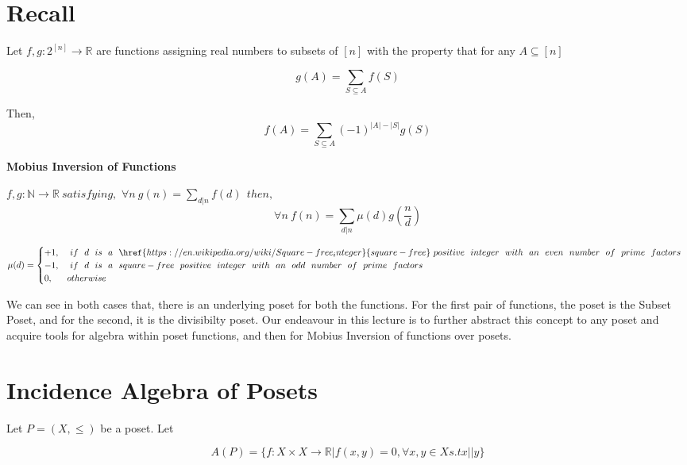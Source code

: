 
\section{Recall}

\begin{theorem}
  \label{stronger PIE}
  Let $f,g:2^{[n]}\longrightarrow \mathbb{R}$ are functions assigning real numbers to subsets of $[n]$ with the property that for any $A\subseteq [n]$

  \[ g(A)=\sum_{S\subseteq A} f(S)\]

  Then,
  \[ f(A) = \sum_{S \subseteq A} (-1)^{|A|-|S|}g(S)\]

\end{theorem}

\textbf{Mobius Inversion of Functions}

$f,g:\mathbb{N} \to \mathbb{R} ~satisfying,$ $\forall n ~g(n) = \sum_{d|n} f(d)  ~~then,$  
$$\forall n ~f(n) = \sum_{d|n} \mu(d)g(\frac{n}{d})$$

	\[
	\mu(d) = \begin{cases} 
	+1 , & ~if~ ~d~ ~is~ ~a~ ~\href{https://en.wikipedia.org/wiki/Square-free_integer}{square-free} ~positive~ ~integer~ ~with~ ~an~ ~even~ ~number~ ~of~ ~prime~ ~factors~~\\
 	-1 , & ~if~ ~d~ ~is~ ~a~ ~square-free~ ~positive~ ~integer~ ~with~ ~an~ ~odd~ ~number~ ~of~ ~prime~ ~factors~~\\
	0 , & otherwise
	\end{cases}
	\]

We can see in both cases that, there is an underlying poset for both the functions. For the first pair of functions, the poset is the Subset Poset, and for the second, it is the divisibilty poset. Our endeavour in this lecture is to further abstract this concept to any poset and acquire tools for algebra within poset functions, and then for Mobius Inversion of functions over posets.

\section{Incidence Algebra of Posets}

Let $P = (X,\le)$ be a poset. Let 

$$ A(P) = \{ f: X \times X \to \mathbb{R} | f(x,y) = 0, \forall x,y \in X  s.t x || y \}$$

